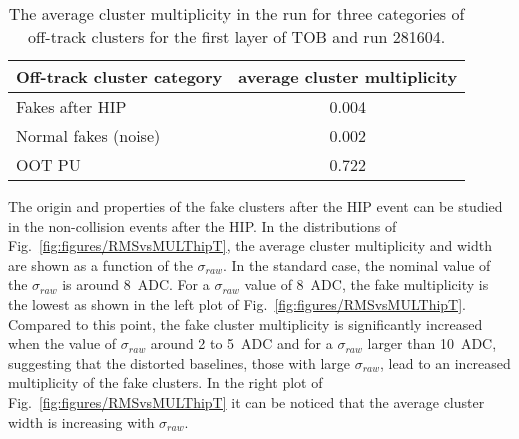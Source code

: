 \begin{table}[h]
\begin{center}
\begin{tabular}{|l|c|}
\hline
Off-track cluster category & average cluster multiplicity \\
\hline
Fakes after HIP & 0.004  \\
Normal fakes (noise) & 0.002  \\
OOT PU & 0.722 \\
\hline
\end{tabular}
\caption[Table caption text]{The average cluster multiplicity in the run for three categories of off-track clusters for the first layer of TOB and run 281604. }
\label{tab:multFake}
\end{center}
\end{table}




The origin and properties of the fake clusters after the HIP event can be studied in the non-collision events after the HIP. In the distributions of Fig.~\ref{fig:figures/RMSvsMULThipT}, the average cluster multiplicity and width are shown as a function of the $\sigma_{raw}$. In the standard case, the nominal value of the $\sigma_{raw}$ is around 8~ADC. For a  $\sigma_{raw}$ value of 8~ADC, the fake multiplicity is the lowest as shown in the left plot of Fig.~\ref{fig:figures/RMSvsMULThipT}. Compared to this point, the fake cluster multiplicity is significantly increased when the value of $\sigma_{raw}$  around 2 to 5~ADC and for a $\sigma_{raw}$ larger than 10~ADC, suggesting that the distorted baselines, those with large $\sigma_{raw}$, lead to an increased multiplicity of the fake clusters. In the right plot of Fig.~\ref{fig:figures/RMSvsMULThipT} it can be noticed that the average cluster width is increasing with $\sigma_{raw}$. 

